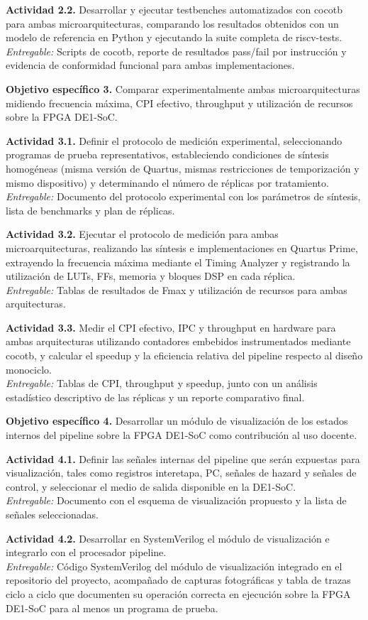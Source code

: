 \textbf{Actividad 2.2.}
Desarrollar y ejecutar testbenches automatizados con cocotb para ambas microarquitecturas, comparando los resultados obtenidos con un modelo de referencia en Python y ejecutando la suite completa de riscv-tests.
\\
\textit{Entregable:} Scripts de cocotb, reporte de resultados pass/fail por instrucción y evidencia de conformidad funcional para ambas implementaciones.

\textbf{Objetivo específico 3.} Comparar experimentalmente ambas microarquitecturas midiendo frecuencia máxima, CPI efectivo, throughput y utilización de recursos sobre la FPGA DE1-SoC.

\textbf{Actividad 3.1.}
Definir el protocolo de medición experimental, seleccionando programas de prueba representativos, estableciendo condiciones de síntesis homogéneas (misma versión de Quartus, mismas restricciones de temporización y mismo dispositivo) y determinando el número de réplicas por tratamiento.
\\
\textit{Entregable:} Documento del protocolo experimental con los parámetros de síntesis, lista de benchmarks y plan de réplicas.

\textbf{Actividad 3.2.}
Ejecutar el protocolo de medición para ambas microarquitecturas, realizando las síntesis e implementaciones en Quartus Prime, extrayendo la frecuencia máxima mediante el Timing Analyzer y registrando la utilización de LUTs, FFs, memoria y bloques DSP en cada réplica.
\\
\textit{Entregable:} Tablas de resultados de Fmax y utilización de recursos para ambas arquitecturas.

\textbf{Actividad 3.3.}
Medir el CPI efectivo, IPC y throughput en hardware para ambas arquitecturas utilizando contadores embebidos instrumentados mediante cocotb, y calcular el speedup y la eficiencia relativa del pipeline respecto al diseño monociclo.
\\
\textit{Entregable:} Tablas de CPI, throughput y speedup, junto con un análisis estadístico descriptivo de las réplicas y un reporte comparativo final.

\textbf{Objetivo específico 4.} Desarrollar un módulo de visualización de los estados internos del pipeline sobre la FPGA DE1-SoC como contribución al uso docente.

\textbf{Actividad 4.1.}
Definir las señales internas del pipeline que serán expuestas para visualización, tales como registros interetapa, PC, señales de hazard y señales de control, y seleccionar el medio de salida disponible en la DE1-SoC.
\\
\textit{Entregable:} Documento con el esquema de visualización propuesto y la lista de señales seleccionadas.

\textbf{Actividad 4.2.}
Desarrollar en SystemVerilog el módulo de visualización e integrarlo con el procesador pipeline.
\\
\textit{Entregable:} Código SystemVerilog del módulo de visualización integrado en el repositorio del proyecto, acompañado de capturas fotográficas y tabla de trazas ciclo a ciclo que documenten su operación correcta en ejecución sobre la FPGA DE1-SoC para al menos un programa de prueba.